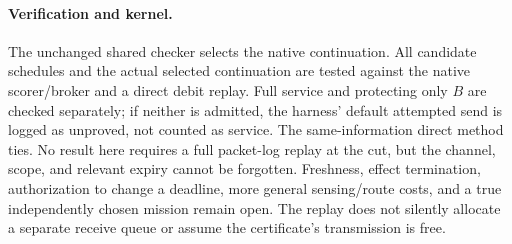 \documentclass{article}
\begin{document}
\paragraph{Verification and kernel.}
The unchanged shared checker selects the native continuation. All
candidate schedules and the actual selected continuation are tested
against the native scorer/broker and a direct debit replay. Full
service and protecting only $B$ are checked separately; if neither
is admitted, the harness' default attempted send is logged as
unproved, not counted as service. The same-information direct method
ties. No result here requires a full packet-log replay at the cut, but
the channel, scope, and relevant expiry cannot be forgotten. Freshness,
effect termination, authorization to change a deadline, more general
sensing/route costs, and a true independently chosen mission remain
open. The replay does not silently allocate a separate receive queue
or assume the certificate's transmission is free.
\end{document}
